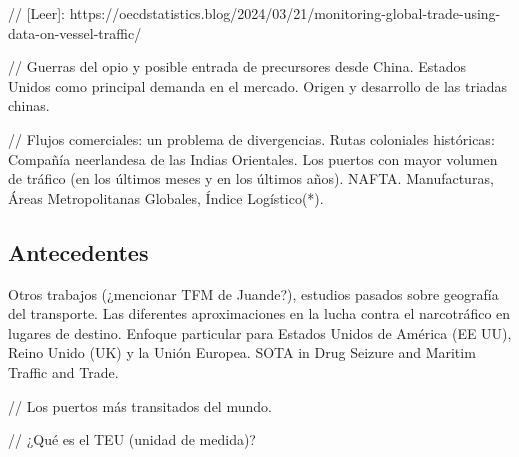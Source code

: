 \documentclass{article}
\begin{document}
// [Leer]: https://oecdstatistics.blog/2024/03/21/monitoring-global-trade-using-data-on-vessel-traffic/



// Guerras del opio y posible entrada de precursores desde China. Estados Unidos como principal demanda en el mercado. Origen y desarrollo de las triadas chinas.

// Flujos comerciales: un problema de divergencias. Rutas coloniales históricas: Compañía neerlandesa de las Indias Orientales. Los puertos con mayor volumen de tráfico (en los últimos meses y en los últimos años). NAFTA. Manufacturas, Áreas Metropolitanas Globales, Índice Logístico(*).



\subsection{Antecedentes}
Otros trabajos (¿mencionar TFM de Juande?), estudios pasados sobre geografía del transporte.
Las diferentes aproximaciones en la lucha contra el narcotráfico en lugares de destino. Enfoque particular para Estados Unidos de América (EE UU), Reino Unido (UK) y la Unión Europea.
SOTA in Drug Seizure and Maritim Traffic and Trade.

// Los puertos más transitados del mundo.

// ¿Qué es el TEU (unidad de medida)?
\end{document}
